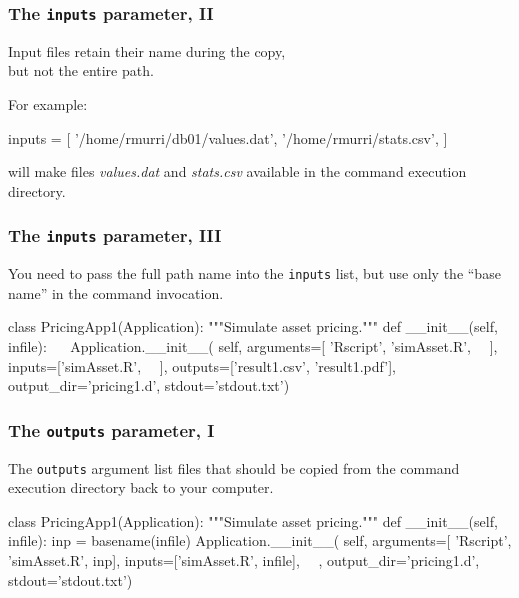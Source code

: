\documentclass[english,serif,mathserif,xcolor=pdftex,dvipsnames,table]{beamer}
\begin{document}
\begin{frame}[fragile]
  \frametitle{The \texttt{inputs} parameter, II}

  Input files retain their name during the copy, \\ but not the entire path.

  \+
  For example:
  \begin{python}
    inputs = [
      '/home/rmurri/db01/values.dat',
      '/home/rmurri/stats.csv',
    ]
  \end{python}
  will make files \emph{values.dat} and \emph{stats.csv} available in
  the command execution directory.

\end{frame}


\begin{frame}[fragile]
  \frametitle{The \texttt{inputs} parameter, III}

  You need to pass the full path name into the
  \texttt{inputs} list, but use only the ``base name'' in the command
  invocation.

\begin{python}
class PricingApp1(Application):
  """Simulate asset pricing."""
  def __init__(self, infile):
    ~~
    Application.__init__(
      self,
      arguments=[
        'Rscript', 'simAsset.R', ~~],
      inputs=['simAsset.R', ~~],
      outputs=['result1.csv', 'result1.pdf'],
      output_dir='pricing1.d',
      stdout='stdout.txt')
\end{python}
\end{frame}


\begin{frame}[fragile]
\frametitle{The \texttt{outputs} parameter, I}

The \texttt{outputs} argument list files that should be copied from
the command execution directory back to your computer.

  \+
\begin{python}
class PricingApp1(Application):
  """Simulate asset pricing."""
  def __init__(self, infile):
    inp = basename(infile)
    Application.__init__(
      self,
      arguments=[
        'Rscript', 'simAsset.R', inp],
      inputs=['simAsset.R', infile],
      ~~,
      output_dir='pricing1.d',
      stdout='stdout.txt')
\end{python}
\end{frame}
\end{document}
